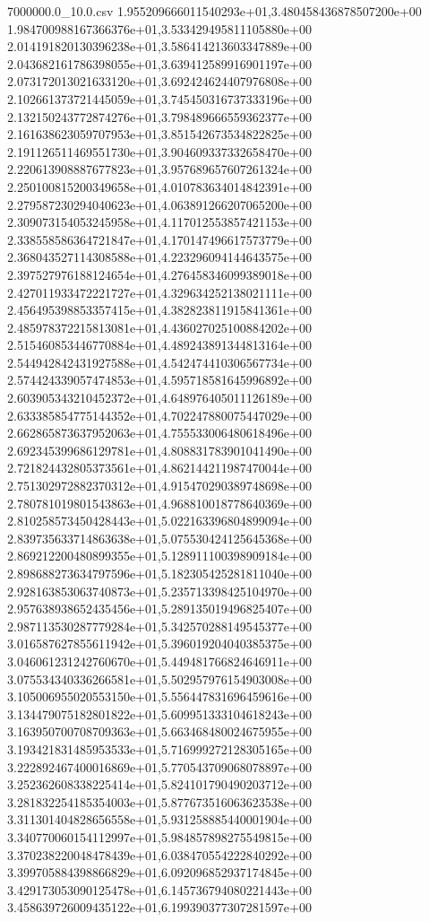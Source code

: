 \begin{filecontents*}{7000000.0_10.0.csv}
1.955209666011540293e+01,3.480458436878507200e+00
1.984700988167366376e+01,3.533429495811105880e+00
2.014191820130396238e+01,3.586414213603347889e+00
2.043682161786398055e+01,3.639412589916901197e+00
2.073172013021633120e+01,3.692424624407976808e+00
2.102661373721445059e+01,3.745450316737333196e+00
2.132150243772874276e+01,3.798489666559362377e+00
2.161638623059707953e+01,3.851542673534822825e+00
2.191126511469551730e+01,3.904609337332658470e+00
2.220613908887677823e+01,3.957689657607261324e+00
2.250100815200349658e+01,4.010783634014842391e+00
2.279587230294040623e+01,4.063891266207065200e+00
2.309073154053245958e+01,4.117012553857421153e+00
2.338558586364721847e+01,4.170147496617573779e+00
2.368043527114308588e+01,4.223296094144643575e+00
2.397527976188124654e+01,4.276458346099389018e+00
2.427011933472221727e+01,4.329634252138021111e+00
2.456495398853357415e+01,4.382823811915841361e+00
2.485978372215813081e+01,4.436027025100884202e+00
2.515460853446770884e+01,4.489243891344813164e+00
2.544942842431927588e+01,4.542474410306567734e+00
2.574424339057474853e+01,4.595718581645996892e+00
2.603905343210452372e+01,4.648976405011126189e+00
2.633385854775144352e+01,4.702247880075447029e+00
2.662865873637952063e+01,4.755533006480618496e+00
2.692345399686129781e+01,4.808831783901041490e+00
2.721824432805373561e+01,4.862144211987470044e+00
2.751302972882370312e+01,4.915470290389748698e+00
2.780781019801543863e+01,4.968810018778640369e+00
2.810258573450428443e+01,5.022163396804899094e+00
2.839735633714863638e+01,5.075530424125645368e+00
2.869212200480899355e+01,5.128911100398909184e+00
2.898688273634797596e+01,5.182305425281811040e+00
2.928163853063740873e+01,5.235713398425104970e+00
2.957638938652435456e+01,5.289135019496825407e+00
2.987113530287779284e+01,5.342570288149545377e+00
3.016587627855611942e+01,5.396019204040385375e+00
3.046061231242760670e+01,5.449481766824646911e+00
3.075534340336266581e+01,5.502957976154903008e+00
3.105006955020553150e+01,5.556447831696459616e+00
3.134479075182801822e+01,5.609951333104618243e+00
3.163950700708709363e+01,5.663468480024675955e+00
3.193421831485953533e+01,5.716999272128305165e+00
3.222892467400016869e+01,5.770543709068078897e+00
3.252362608338225414e+01,5.824101790490203712e+00
3.281832254185354003e+01,5.877673516063623538e+00
3.311301404828656558e+01,5.931258885440001904e+00
3.340770060154112997e+01,5.984857898275549815e+00
3.370238220048478439e+01,6.038470554222840292e+00
3.399705884398866829e+01,6.092096852937174845e+00
3.429173053090125478e+01,6.145736794080221443e+00
3.458639726009435122e+01,6.199390377307281597e+00

\end{filecontents*}
